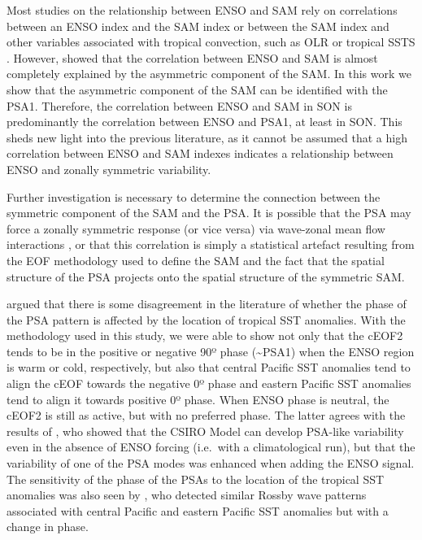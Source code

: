 \documentclass[pdflatex,lineno,sn-basic]{sn-jnl}
\theoremstyle{thmstyleone}%
\theoremstyle{thmstyletwo}%
\theoremstyle{thmstylethree}%
\begin{document}
Most studies on the relationship between ENSO and SAM rely on correlations between an ENSO index and the SAM index \citep[e.g.][\citet{cai2011a}]{lheureux2006} or between the SAM index and other variables associated with tropical convection, such as OLR or tropical SSTS \citep[e.g.][]{carvalho2005}.
However, \citet{campitelli2022} showed that the correlation between ENSO and SAM is almost completely explained by the asymmetric component of the SAM.
In this work we show that the asymmetric component of the SAM can be identified with the PSA1.
Therefore, the correlation between ENSO and SAM in SON is predominantly the correlation between ENSO and PSA1, at least in SON.
This sheds new light into the previous literature, as it cannot be assumed that a high correlation between ENSO and SAM indexes indicates a relationship between ENSO and zonally symmetric variability.

Further investigation is necessary to determine the connection between the symmetric component of the SAM and the PSA.
It is possible that the PSA may force a zonally symmetric response (or vice versa) via wave-zonal mean flow interactions \citep{kim2004}, or that this correlation is simply a statistical artefact resulting from the EOF methodology used to define the SAM and the fact that the spatial structure of the PSA projects onto the spatial structure of the symmetric SAM.

\citet{irving2016} argued that there is some disagreement in the literature of whether the phase of the PSA pattern is affected by the location of tropical SST anomalies.
With the methodology used in this study, we were able to show not only that the cEOF2 tends to be in the positive or negative 90º phase (\textasciitilde PSA1) when the ENSO region is warm or cold, respectively, but also that central Pacific SST anomalies tend to align the cEOF towards the negative 0º phase and eastern Pacific SST anomalies tend to align it towards positive 0º phase.
When ENSO phase is neutral, the cEOF2 is still as active, but with no preferred phase.
The latter agrees with the results of \citet{cai2002}, who showed that the CSIRO Model can develop PSA-like variability even in the absence of ENSO forcing (i.e.~with a climatological run), but that the variability of one of the PSA modes was enhanced when adding the ENSO signal.
The sensitivity of the phase of the PSAs to the location of the tropical SST anomalies was also seen by \citet{ciasto2015}, who detected similar Rossby wave patterns associated with central Pacific and eastern Pacific SST anomalies but with a change in phase.
\end{document}
